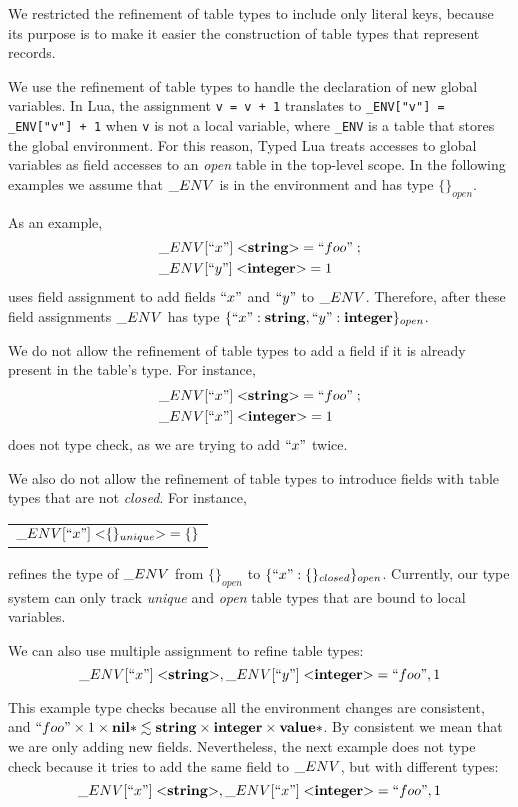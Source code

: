 \documentclass[preprint]{sigplanconf}
\newcommand{\Value}{\mathbf{value}}
\newcommand{\Nil}{\mathbf{nil}}
\newcommand{\Integer}{\mathbf{integer}}
\newcommand{\String}{\mathbf{string}}
\begin{document}
We restricted the refinement of table types to include only literal
keys, because its purpose is to make it easier the construction of
table types that represent records.

We use the refinement of table types to handle the declaration of
new global variables.
In Lua, the assignment \texttt{v = v + 1} translates to
\texttt{\string_ENV["v"] = \string_ENV["v"] + 1} when \texttt{v}
is not a local variable, where \texttt{\string_ENV} is a table
that stores the global environment.
For this reason, Typed Lua treats accesses to global variables as field accesses
to an \emph{open} table in the top-level scope.
In the following examples we assume that $\string_ENV$ is in the
environment and has type $\{\}_{open}$.

As an example,
\begin{align*}
& \string_ENV[``x"] \; {<}\String{>} = ``foo" \;; \\
& \string_ENV[``y"] \; {<}\Integer{>} = 1
\end{align*}
uses field assignment to add fields $``x"$ and $``y"$ to $\string_ENV$.
Therefore, after these field assignments $\string_ENV$ has type
$\{``x":\String, ``y":\Integer\}_{open}$.

We do not allow the refinement of table types to add a field if it is
already present in the table's type.
For instance,
\begin{align*}
& \string_ENV[``x"] \; {<}\String{>} = ``foo" \;; \\
& \string_ENV[``x"] \; {<}\Integer{>} = 1
\end{align*}
does not type check, as we are trying to add $``x"$ twice.

We also do not allow the refinement of table types to introduce
fields with table types that are not \emph{closed}.
For instance,
\begin{center}
\begin{tabular}{l}
$\string_ENV[``x"] \; {<}\{\}_{unique}{>} = \{\}$
\end{tabular}
\end{center}
refines the type of $\string_ENV$ from $\{\}_{open}$ to $\{``x":\{\}_{closed}\}_{open}$.
Currently, our type system can only track \emph{unique} and
\emph{open} table types that are bound to local variables.

We can also use multiple assignment to refine table types:
\[
\string_ENV[``x"] \; {<}\String{>}, \string_ENV[``y"] \; {<}\Integer{>} = ``foo", 1
\]

This example type checks because all the environment changes are consistent, and
$``foo" \times 1 \times \Nil{*} \lesssim \String \times \Integer \times \Value{*}$.
By consistent we mean that we are only adding new fields.
Nevertheless, the next example does not type check because it tries to add
the same field to $\string_ENV$, but with different types:
\[
\string_ENV[``x"] \; {<}\String{>}, \string_ENV[``x"] \; {<}\Integer{>} = ``foo", 1
\]
\end{document}
